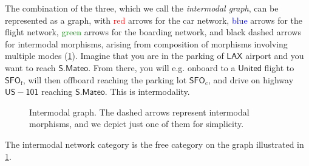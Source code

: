 \begin{example}
The combination of the three, which we call the \emph{intermodal graph}, can be represented as a graph, with \textcolor{red}{red} arrows for the car network, \textcolor{blue}{blue} arrows for the flight network, \textcolor{green}{green} arrows for the boarding network, and black dashed arrows for intermodal morphisms, arising from composition of morphisms involving multiple modes (\cref{fig:intermodal}). Imagine that you are in the parking of $\mathsf{LAX}$ airport and you want to reach $\mathsf{S. Mateo}$. From there, you will e.g. onboard to a $\mathsf{United}$ flight to $\mathsf{SFO}_\mathrm{f}$, will then offboard reaching the parking lot $\mathsf{SFO}_\mathrm{c}$, and drive on highway $\mathsf{US-101}$ reaching $\mathsf{S. Mateo}$. This is intermodality.

\begin{figure}[h!]
\begin{center}
\end{center}
\caption{Intermodal graph. The dashed arrows represent intermodal morphisms, and we depict just one of them for simplicity. \label{fig:intermodal}}
\end{figure}
\end{example}

The intermodal network category is the free category on the graph illustrated in \cref{fig:intermodal}.

\begin{comment}
\begin{shaded}
\begin{definition}[Union of categories]
Given two categories $\CatC,\CatD$, one can create the \emph{union} $\Cat{E}$ of the two, which is composed of:
\begin{compactenum}
\item \emph{Objects:} $\Ob_\Cat{E}=\Ob_\CatC \cup \Ob_\CatD$.
\item \emph{Morphisms:} A morphism $f$ is given by considering the followng. If $f\in \Hom_\CatC(X,Y)$, then $f\in \Hom_\Cat{E}(X,Y)$. If $f\in \Hom_\CatD(X,Y)$, then $f\in \Hom_\Cat{E}(X,Y)$.
\item \emph{Identity morphism:} For any morphism in $\Cat{E}$, the identity morphism remais the same as in the original category.
\item \emph{Composition operation}: The composition of morphisms remains the same.
\end{compactenum}
\end{definition}
\end{shaded}
\end{comment}


